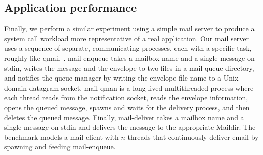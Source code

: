\begin{comment}
The application could perform the name lookup once by a setting up a
stream socket at the beginning, and then using \code{send} to
communicate.  This setup results in better scalability (see the line
labeled ``Linux with $n$ streams''). But, in this setup, a spin
lock in the scheduler becomes a bottleneck (\XXX[FK][double check]).
Clearly, Linux developers could remove these bottlenecks.  What is nice
about our approach is that the commutativity rule makes clear that these
locks can be removed and that \tool{} can catch these non-scalable
invocations that should be scalable.  \XXX[FK][We should mention
somewhere that we have a model for unordered and ordered sockets.]

\begin{figure}
  \centering
  
  \caption{Scalability of $n$ clients concurrently sending and receiving 1
    byte messages to/from $n$ server  processes.}
  \label{fig:sockbench}
\end{figure}
\end{comment}


\subsection{Application performance}
\label{sec:eval:app}


Finally, we perform a similar experiment using a simple mail server to
produce a system call workload more representative of a real
application.  Our mail server uses a sequence of separate, communicating
processes, each with a specific task, roughly like qmail~\cite{qmail}.
{mail-enqueue} takes a mailbox name and a single message on
stdin, writes the message and the envelope to two files in a
mail queue directory, and notifies the queue manager by writing the
envelope file
name to a Unix domain datagram socket.  {mail-qman} is a long-lived
multithreaded process where each thread reads from the notification
socket, reads the envelope information, opens the queued message, spawns
and waits for the delivery process, and then deletes the queued message.
Finally, {mail-deliver} takes a mailbox name and a single message
on stdin and delivers the message to the appropriate Maildir.
The benchmark models a mail client with $n$ threads that continuously
deliver email by spawning and feeding {mail-enqueue}.

